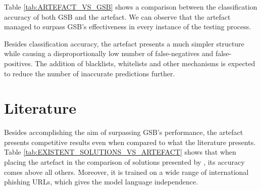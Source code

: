 Table \ref{tab:ARTEFACT_VS_GSB} shows a comparison between the classification accuracy of both GSB and the artefact. We can observe that the artefact managed to surpass GSB's effectiveness in every instance of the testing process.

Besides classification accuracy, the artefact presents a much simpler structure while causing a disproportionally low number of false-negatives and false-positives. The addition of blacklists, whitelists and other mechanisms is expected to reduce the number of inaccurate predictions further.

\section{Literature}
Besides accomplishing the aim of surpassing GSB's performance, the artefact presents competitive results even when compared to what the literature presents. Table \ref{tab:EXISTENT_SOLUTIONS_VS_ARTEFACT} shows that when placing the artefact in the comparison of solutions presented by \cite{Adebowale}, its accuracy comes above all others. Moreover, it is trained on a wide range of international phishing URLs, which gives the model language independence.

